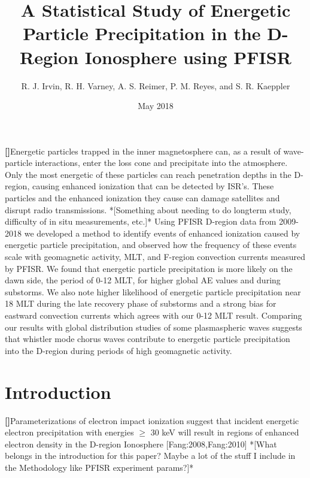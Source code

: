 \documentclass{article}
\author{R. J. Irvin, R. H. Varney, A. S. Reimer, P. M. Reyes, and S. R. Kaeppler}
\title{A Statistical Study of Energetic Particle Precipitation in the D-Region Ionosphere using PFISR}
\date{May 2018}
\newcounter{para}
\newcommand\mypara{\par\refstepcounter{para}\textbf{[\thepara]}\space}
\begin{document}
\maketitle


\mypara Energetic particles trapped in the inner magnetosphere can, as a result of wave-particle interactions, enter the loss cone and precipitate into the atmosphere. Only the most energetic of these particles can reach penetration depths in the D-region, causing enhanced ionization that can be detected by ISR's. These particles and the enhanced ionization they cause can damage satellites and disrupt radio transmissions. 
*[Something about needing to do longterm study, difficulty of in situ measurements, etc.]*
Using PFISR D-region data from 2009-2018 we developed a method to identify events of enhanced ionization caused by energetic particle precipitation, and observed how the frequency of these events scale with geomagnetic activity, MLT, and F-region convection currents measured by PFISR.
We found that energetic particle precipitation is more likely on the dawn side, the period of 0-12 MLT, for higher global AE values and during substorms. We also note higher likelihood of energetic particle precipitation near 18 MLT during the late recovery phase of substorms and a strong bias for eastward convection currents which agrees with our 0-12 MLT result.
Comparing our results with global distribution studies of some plasmaspheric waves suggests that whistler mode chorus waves contribute to energetic particle precipitation into the D-region during periods of high geomagnetic activity. 
\section{Introduction}
\mypara Parameterizations of electron impact ionization suggest that incident energetic electron precipitation with energies $\geq$ 30 keV will result in regions of enhanced electron density in the D-region Ionosphere [Fang:2008,Fang:2010]
*[What belongs in the introduction for this paper? Maybe a lot of the stuff I include in the Methodology like PFISR experiment params?]*
\end{document}
